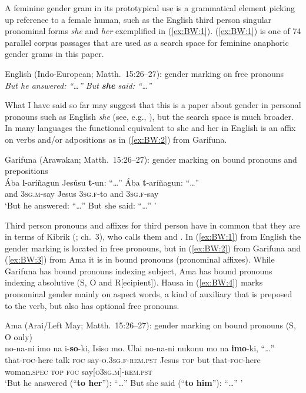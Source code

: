 \documentclass[output=collectionpaper]{langsci/langscibook}
\begin{document}
A feminine gender gram \textendash{} in its prototypical use \textendash{} is a grammatical element picking up reference to a female human, such as the English third person singular pronominal forms \textit{she} and \textit{her} exemplified in (\ref{ex:BW:1}). (\ref{ex:BW:1}) is one of 74 parallel corpus passages that are used as a search space for feminine anaphoric gender grams in this paper.

\ea\label{ex:BW:1}
English (Indo-European; Matth.~15:26--27): gender marking on free pronouns\\
\textit{But he answered: ``\ldots'' But \textbf{she} said: ``\ldots''}
\z

What I have said so far may suggest that this is a paper about gender in personal pronouns such as English \textit{she} (see, e.g., \citealt{Audring2009a}), but the search space is much broader. In many languages the functional equivalent to she and her in English is an affix on verbs and/or adpositions as in (\ref{ex:BW:2}) from Garifuna.

\ea\label{ex:BW:2}
Garifuna (Arawakan; Matth.~15:26–27): gender marking on bound pronouns and prepositions\\
\gll Ába	\textbf{l}-aríñagun	Jesúsu	\textbf{t}-un:	``\ldots''	Ába	\textbf{t}-aríñagun:	``\ldots''\\
and	3\textsc{sg.m}-say	Jesus	3\textsc{sg.f}-to {}		and	3\textsc{sg.f}-say {}\\
\glt ‘But he answered: ``\ldots'' But she said: ``\ldots'' ’
\z

Third person pronouns and affixes for third person have in common that they are  in terms of Kibrik (\citeyear{Kibrik2011}; ch.~3), who calls them  and . In (\ref{ex:BW:1}) from English the gender marking is located in free pronouns, but in (\ref{ex:BW:2}) from Garifuna and (\ref{ex:BW:3}) from Ama it is in bound pronouns (pronominal affixes). While Garifuna has bound pronouns indexing subject, Ama has bound pronouns indexing absolutive (S, O and R[ecipient]). Hausa in (\ref{ex:BW:4}) marks pronominal gender mainly on aspect words, a kind of auxiliary that is preposed to the verb, but also has optional free pronouns.

\ea\label{ex:BW:3}
Ama (Arai/Left May; Matth.~15:26–27): gender marking on bound pronouns (S, O only)\\
\gll [\ldots]	no-na-ni	imo	na	i-\textbf{so}-ki,	Isiso	mo. Ulai	no-na-ni	nukonu	mo	na	\textbf{imo}-ki,	``\ldots''\\
{} that-\textsc{foc}-here	talk \textsc{foc}	say-\textsc{o.3sg.f-rem.pst}	Jesus	\textsc{top} but	that-\textsc{foc}-here	woman.\textsc{spec}	\textsc{top}	\textsc{foc}	say[\textsc{o3sg.m}]-\textsc{rem.pst}\\
\glt ‘But he answered (``\textbf{to her}''): ``\ldots'' But she said (``\textbf{to him}''): ``\ldots'' ’
\z
\end{document}
